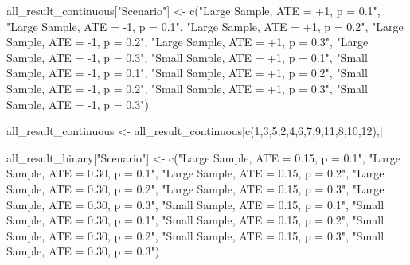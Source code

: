 \documentclass[
]{article}
\newenvironment{Shaded}{\begin{snugshade}}{\end{snugshade}}
\newcommand{\DecValTok}[1]{\textcolor[rgb]{0.00,0.00,0.81}{#1}}
\newcommand{\FunctionTok}[1]{\textcolor[rgb]{0.00,0.00,0.00}{#1}}
\newcommand{\NormalTok}[1]{#1}
\newcommand{\OtherTok}[1]{\textcolor[rgb]{0.56,0.35,0.01}{#1}}
\newcommand{\StringTok}[1]{\textcolor[rgb]{0.31,0.60,0.02}{#1}}
\begin{document}
\begin{Shaded}
\begin{Highlighting}[]
\NormalTok{all\_result\_continuous[}\StringTok{"Scenario"}\NormalTok{] }\OtherTok{\textless{}{-}} 
                          \FunctionTok{c}\NormalTok{(}\StringTok{"Large Sample, ATE = +1, p = 0.1"}\NormalTok{, }
                            \StringTok{"Large Sample, ATE = {-}1, p = 0.1"}\NormalTok{,}
                            \StringTok{"Large Sample, ATE = +1, p = 0.2"}\NormalTok{,}
                            \StringTok{"Large Sample, ATE = {-}1, p = 0.2"}\NormalTok{,}
                            \StringTok{"Large Sample, ATE = +1, p = 0.3"}\NormalTok{,}
                            \StringTok{"Large Sample, ATE = {-}1, p = 0.3"}\NormalTok{,}
                            \StringTok{"Small Sample, ATE = +1, p = 0.1"}\NormalTok{,}
                            \StringTok{"Small Sample, ATE = {-}1, p = 0.1"}\NormalTok{,}
                            \StringTok{"Small Sample, ATE = +1, p = 0.2"}\NormalTok{,}
                            \StringTok{"Small Sample, ATE = {-}1, p = 0.2"}\NormalTok{,}
                            \StringTok{"Small Sample, ATE = +1, p = 0.3"}\NormalTok{,}
                            \StringTok{"Small Sample, ATE = {-}1, p = 0.3"}\NormalTok{)}

\NormalTok{all\_result\_continuous }\OtherTok{\textless{}{-}}\NormalTok{ all\_result\_continuous[}\FunctionTok{c}\NormalTok{(}\DecValTok{1}\NormalTok{,}\DecValTok{3}\NormalTok{,}\DecValTok{5}\NormalTok{,}\DecValTok{2}\NormalTok{,}\DecValTok{4}\NormalTok{,}\DecValTok{6}\NormalTok{,}\DecValTok{7}\NormalTok{,}\DecValTok{9}\NormalTok{,}\DecValTok{11}\NormalTok{,}\DecValTok{8}\NormalTok{,}\DecValTok{10}\NormalTok{,}\DecValTok{12}\NormalTok{),]}


\NormalTok{all\_result\_binary[}\StringTok{"Scenario"}\NormalTok{] }\OtherTok{\textless{}{-}} 
                          \FunctionTok{c}\NormalTok{(}\StringTok{"Large Sample, ATE = 0.15, p = 0.1"}\NormalTok{, }
                            \StringTok{"Large Sample, ATE = 0.30, p = 0.1"}\NormalTok{,}
                            \StringTok{"Large Sample, ATE = 0.15, p = 0.2"}\NormalTok{,}
                            \StringTok{"Large Sample, ATE = 0.30, p = 0.2"}\NormalTok{,}
                            \StringTok{"Large Sample, ATE = 0.15, p = 0.3"}\NormalTok{,}
                            \StringTok{"Large Sample, ATE = 0.30, p = 0.3"}\NormalTok{,}
                            \StringTok{"Small Sample, ATE = 0.15, p = 0.1"}\NormalTok{,}
                            \StringTok{"Small Sample, ATE = 0.30, p = 0.1"}\NormalTok{,}
                            \StringTok{"Small Sample, ATE = 0.15, p = 0.2"}\NormalTok{,}
                            \StringTok{"Small Sample, ATE = 0.30, p = 0.2"}\NormalTok{,}
                            \StringTok{"Small Sample, ATE = 0.15, p = 0.3"}\NormalTok{,}
                            \StringTok{"Small Sample, ATE = 0.30, p = 0.3"}\NormalTok{)}


\end{Highlighting}
\end{Shaded}
\end{document}
